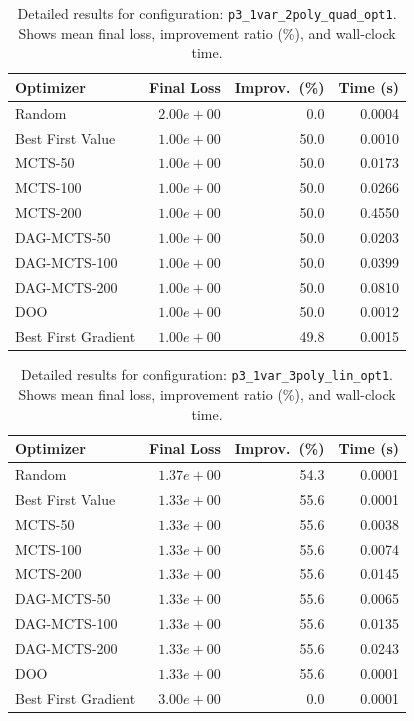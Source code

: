 \begin{table}[H]
\centering
\caption{Detailed results for configuration: \texttt{p3\_1var\_2poly\_quad\_opt1}. Shows mean final loss, improvement ratio (\%), and wall-clock time.}
\label{tab:abssum-detail-14}
\begin{tabular}{lrrr}
\toprule
Optimizer & Final Loss & Improv.~(\%) & Time (s) \\
\midrule
Random & $2.00e+00$ & 0.0 & 0.0004 \\
\hline
Best First Value & \textbf{$1.00e+00$} & 50.0 & 0.0010 \\
\hline
MCTS-50 & \textbf{$1.00e+00$} & 50.0 & 0.0173 \\
\hline
MCTS-100 & \textbf{$1.00e+00$} & 50.0 & 0.0266 \\
\hline
MCTS-200 & \textbf{$1.00e+00$} & 50.0 & 0.4550 \\
\hline
DAG-MCTS-50 & \textbf{$1.00e+00$} & 50.0 & 0.0203 \\
\hline
DAG-MCTS-100 & \textbf{$1.00e+00$} & 50.0 & 0.0399 \\
\hline
DAG-MCTS-200 & \textbf{$1.00e+00$} & 50.0 & 0.0810 \\
\hline
DOO & $1.00e+00$ & 50.0 & 0.0012 \\
\hline
Best First Gradient & $1.00e+00$ & 49.8 & 0.0015 \\
\bottomrule
\end{tabular}
\end{table}

\begin{table}[H]
\centering
\caption{Detailed results for configuration: \texttt{p3\_1var\_3poly\_lin\_opt1}. Shows mean final loss, improvement ratio (\%), and wall-clock time.}
\label{tab:abssum-detail-15}
\begin{tabular}{lrrr}
\toprule
Optimizer & Final Loss & Improv.~(\%) & Time (s) \\
\midrule
Random & $1.37e+00$ & 54.3 & 0.0001 \\
\hline
Best First Value & \textbf{$1.33e+00$} & 55.6 & 0.0001 \\
\hline
MCTS-50 & \textbf{$1.33e+00$} & 55.6 & 0.0038 \\
\hline
MCTS-100 & \textbf{$1.33e+00$} & 55.6 & 0.0074 \\
\hline
MCTS-200 & \textbf{$1.33e+00$} & 55.6 & 0.0145 \\
\hline
DAG-MCTS-50 & \textbf{$1.33e+00$} & 55.6 & 0.0065 \\
\hline
DAG-MCTS-100 & \textbf{$1.33e+00$} & 55.6 & 0.0135 \\
\hline
DAG-MCTS-200 & \textbf{$1.33e+00$} & 55.6 & 0.0243 \\
\hline
DOO & $1.33e+00$ & 55.6 & 0.0001 \\
\hline
Best First Gradient & $3.00e+00$ & 0.0 & 0.0001 \\
\bottomrule
\end{tabular}
\end{table}

